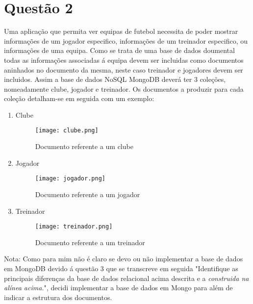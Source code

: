 \section{Questão 2}

Uma aplicação que permita ver equipas de futebol necessita de poder mostrar informações de um jogador especifico, informações de um treinador especifico, ou informações de uma equipa. Como se trata de uma base de dados doumental todas as informações associadas á equipa devem ser incluidas como documentos aninhados no documento da mesma, neste caso treinador e jogadores devem ser incluidos.
Assim a base de dados NoSQL MongoDB deverá ter 3 coleções, nomeadamente clube, jogador e treinador. Os documentos a produzir para cada coleção detalham-se em seguida com um exemplo:
\begin{enumerate}
	\item Clube
		\begin{figure}[H]

		  \centering
		  \captionsetup{justification=centering}

		  \texttt{[image: clube.png]}
		  
		  \caption {Documento referente a um clube}
		\end{figure}
	\item Jogador
		\begin{figure}[H]

		  \centering
		  \captionsetup{justification=centering}

		  \texttt{[image: jogador.png]}
		  
		  \caption {Documento referente a um jogador}
		\end{figure}
	\newpage
	\item Treinador
		\begin{figure}[H]

		  \centering
		  \captionsetup{justification=centering}

		  \texttt{[image: treinador.png]}
		  
		  \caption {Documento referente a um treinador}
		\end{figure}
\end{enumerate}


\par Nota: Como para mim não é claro se devo ou não implementar a base de dados em MongoDB devido á questão 3 que se transcreve em seguida "Identifique as principais diferen\c{c}as da base de dados relacional acima descrita e a \textit{construida na alínea acima.}", decidi implementar a base de dados em Mongo para além de indicar a estrutura dos documentos.
\newline


